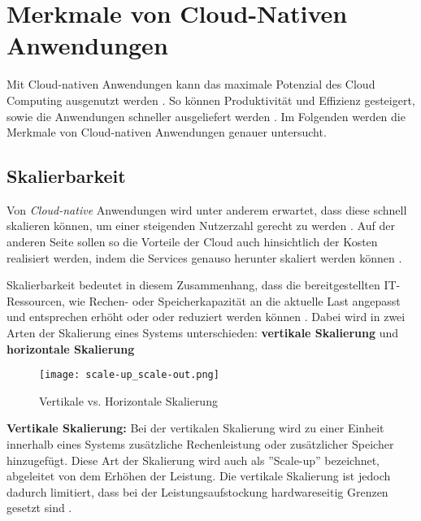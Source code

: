 \section{Merkmale von Cloud-Nativen Anwendungen}
\label{sec:cloud-native-anwendungen}
Mit Cloud-nativen Anwendungen kann das maximale Potenzial des Cloud Computing ausgenutzt werden \cite[Vgl.][]{VMwareb}. So können Produktivität und Effizienz gesteigert, sowie die Anwendungen schneller ausgeliefert werden \cite[Vgl][S. 12]{Chandrasekaran2022}. Im Folgenden werden die Merkmale von Cloud-nativen Anwendungen genauer untersucht.

\subsection{Skalierbarkeit}
Von \textit{Cloud-native} Anwendungen wird unter anderem erwartet, dass diese schnell skalieren können, um einer steigenden Nutzerzahl gerecht zu werden \cite[Vgl.][S. 1ff]{Armbrust2009} \cite[Vgl.][S. 234]{Villamizar2017}. Auf der anderen Seite sollen so die Vorteile der Cloud auch hinsichtlich der Kosten realisiert werden, indem die Services genauso herunter skaliert werden können \cite[Vgl.][S. 884]{Adzic2017}.

Skalierbarkeit bedeutet in diesem Zusammenhang, dass die bereitgestellten IT-Ressourcen, wie Rechen- oder Speicherkapazität an die aktuelle Last angepasst und entsprechen erhöht oder oder reduziert werden können \cite[Vgl.][S. 15]{Reinheimer2018}\cite[Vgl.][]{Geißler2019}. Dabei wird in zwei Arten der Skalierung eines Systems unterschieden: \textbf{vertikale Skalierung} und \textbf{horizontale Skalierung} \cite[Vgl.][]{Geißler2019}\cite[Vgl.][]{VMware}

\begin{figure}[H]
    \centering
    \texttt{[image: scale-up\_scale-out.png]}
    \caption{Vertikale vs. Horizontale Skalierung \cite[Nachbildung nach][]{Bachmann2019}}
    \label{fig:scale-up-scale-out}
\end{figure}
\pagebreak

\textbf{Vertikale Skalierung:}
Bei der vertikalen Skalierung wird zu einer Einheit innerhalb eines Systems zusätzliche Rechenleistung oder zusätzlicher Speicher hinzugefügt. Diese Art der Skalierung wird auch als ''Scale-up'' bezeichnet, abgeleitet von dem Erhöhen der Leistung. Die vertikale Skalierung ist jedoch dadurch limitiert, dass bei der Leistungsaufstockung hardwareseitig Grenzen gesetzt sind \cite[Vgl.][]{Geißler2019}\cite[Vgl.][]{VMware}.

